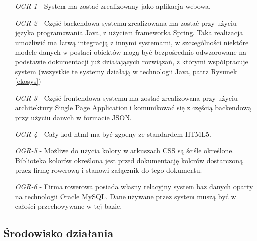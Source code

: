 \documentclass[a4paper,20pt]{article}
\begin{document}
\begin{itemize}[itemindent=4em]
  \item[\textit{OGR-1}] - System ma zostać zrealizowany jako aplikacja webowa.  \\
  \item[\textit{OGR-2}] - Część backendowa systemu zrealizowana ma zostać przy użyciu języka programowania Java, z użyciem frameworka Spring. Taka realizacja umożliwić ma łatwą integracją z innymi systemami, w szczególności niektóre modele danych w postaci obiektów mogą być bezpośrednio odwzorowane na podstawie dokumentacji już działających rozwiązań, z którymi współpracuje system (wszystkie te systemy działają w technologii Java, patrz Rysunek \ref{ekosys}) \\
  \item[\textit{OGR-3}] - Część frontendowa systemu ma zostać zrealizowana przy użyciu architektury Single Page Application i komunikować się z częścią backendową przy użyciu danych w formacie JSON. \\
  \item[\textit{OGR-4}] - Cały kod html ma być zgodny ze standardem HTML5. \\
  \item[\textit{OGR-5}] - Możliwe do użycia kolory w arkuszach CSS są ściśle określone. Biblioteka kolorów określona jest przed dokumentację kolorów dostarczoną przez firmę rowerową i stanowi załącznik do tego dokumentu. \\
  \item[\textit{OGR-6}] - Firma rowerowa posiada własny relacyjny system baz danych oparty na technologii Oracle MySQL. Dane używane przez system muszą być w całości przechowywane w tej bazie.  \\
\end{itemize}



\subsection{Środowisko działania}
\end{document}
